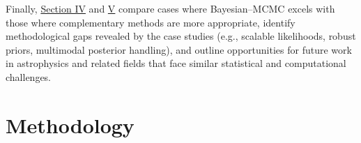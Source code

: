 \documentclass[preprint,longauthor]{aastex631}
\begin{document}
Finally, \hyperref[placeholder]{Section IV} and \hyperref[placeholder]{V} compare cases where Bayesian–MCMC excels with those where complementary methods are more appropriate, identify methodological gaps revealed by the case studies (e.g., scalable likelihoods, robust priors, multimodal posterior handling), and outline opportunities for future work in astrophysics and related fields that face similar statistical and computational challenges.

\section{Methodology}
\label{sec:Methodology}



\end{document}
